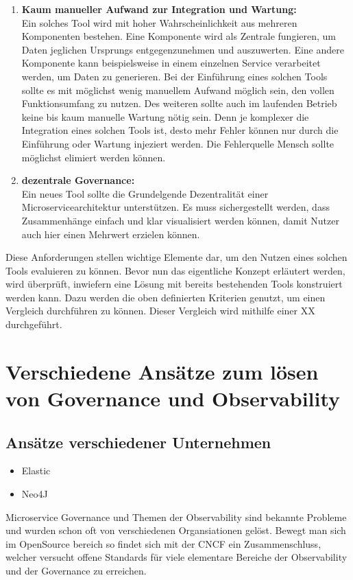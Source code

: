 \documentclass[
	12pt,
	BCOR=5mm,
	DIV=12,
	headinclude=on,
	footinclude=off,
	parskip=half,
	bibliography=totoc,
	listof=entryprefix,
	toc=listof,
	numbers=noenddot,
	plainfootsepline
]{scrreprt}
\begin{document}
\begin{enumerate}
\item \textbf{Kaum manueller Aufwand zur Integration und Wartung:}\\
Ein solches Tool wird mit hoher Wahrscheinlichkeit aus mehreren Komponenten bestehen. Eine Komponente wird als Zentrale fungieren, um Daten jeglichen Ursprungs entgegenzunehmen und auszuwerten. Eine andere Komponente kann beispielsweise in einem einzelnen Service verarbeitet werden, um Daten zu generieren. Bei der Einführung eines solchen Tools sollte es mit möglichst wenig manuellem Aufwand möglich sein, den vollen Funktionsumfang zu nutzen. Des weiteren sollte auch im laufenden Betrieb keine bis kaum manuelle Wartung nötig sein. Denn je komplexer die Integration eines solchen Tools ist, desto mehr Fehler können nur durch die Einführung oder Wartung injeziert werden. Die Fehlerquelle Mensch sollte möglichst elimiert werden können.

\item \textbf{dezentrale Governance:}\\
Ein neues Tool sollte die Grundelgende Dezentralität einer Microservicearchitektur unterstützen. Es muss sichergestellt werden, dass Zusammenhänge einfach und klar visualisiert werden können, damit Nutzer auch hier einen Mehrwert erzielen können.

\end{enumerate}

Diese Anforderungen stellen wichtige Elemente dar, um den Nutzen eines solchen Tools evaluieren zu können. Bevor nun das eigentliche Konzept erläutert werden, wird überprüft, inwiefern eine Lösung mit bereits bestehenden Tools konstruiert werden kann. Dazu werden die oben definierten Kriterien genutzt, um einen Vergleich durchführen zu können. Dieser Vergleich wird mithilfe einer  XX durchgeführt.

\section{Verschiedene Ansätze zum lösen von Governance und Observability}
\subsection{Ansätze verschiedener Unternehmen}
\begin{itemize}
	\item Elastic
	\item Neo4J
\end{itemize}
Microservice Governance und Themen der Observability sind bekannte Probleme und wurden schon oft von verschiedenen Organsiationen gelöst. Bewegt man sich im OpenSource bereich so findet sich mit der \ac{CNCF} ein Zusammenschluss, welcher versucht offene Standards für viele elementare Bereiche der Observability und der Governance zu erreichen.
\end{document}
